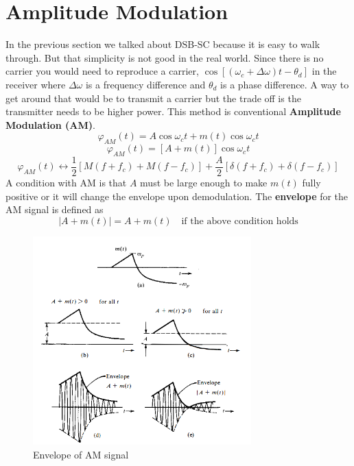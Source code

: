 \documentclass{article}
\begin{document}
    \section{Amplitude Modulation}
    In the previous section we talked about DSB-SC because it is easy to walk through. But that simplicity is not good in the real world. Since there is no
    carrier you would need to reproduce a carrier, $\cos[(\omega_c + \Delta\omega)t-\theta_d]$ in the receiver where $\Delta\omega$ is a frequency difference and
    $\theta_d$ is a phase difference. A way to get around that would be to transmit a carrier but the trade off is the transmitter needs to be higher power. 
    This method is conventional \textbf{Amplitude Modulation (AM)}.
    \begin{equation}
        \varphi_{AM}(t) = A\cos\omega_ct + m(t)\cos\omega_ct
    \end{equation}
    \begin{equation}
        \varphi_{AM}(t) = [A + m(t)] \cos\omega_ct
    \end{equation}
    \begin{equation}
        \varphi_{AM}(t) \leftrightarrow \frac{1}{2}[M(f+f_c) + M(f-f_c)] + \frac{A}{2}[\delta(f+f_c) + \delta(f-f_c)]
    \end{equation}
    A condition with AM is that $A$ must be large enough to make $m(t)$ fully positive or it will change the envelope upon demodulation. The \textbf{envelope}
    for the AM signal is defined as 
    \begin{equation}
        |A + m(t)| = A + m(t) \quad \textrm{if the above condition holds}
    \end{equation}

    \begin{figure}[h]
        \centering
        \includegraphics[width=0.75\textwidth]{am_env}
        \caption{Envelope of AM signal}
    \end{figure}
\end{document}
